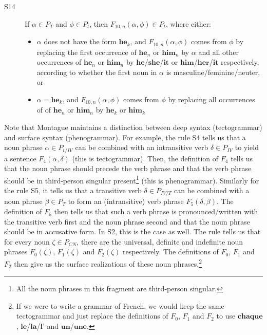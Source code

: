 \begin{description}
\item[S14] If $\alpha \in P_{T}$ and $\phi \in P_{t}$, then
  $F_{10,n}(\alpha, \phi) \in P_{t}$, where either:

  \begin{itemize}
  \item $\alpha$ does not have the form $\textbf{he}_k$, and
    $F_{10,n}(\alpha, \phi)$ comes from $\phi$ by replacing the first
    occurrence of $\textbf{he}_n$ or $\textbf{him}_n$ by $\alpha$ and all
    other occurrences of $\textbf{he}_n$ or $\textbf{him}_n$ by
    $\textbf{he}$/$\textbf{she}$/$\textbf{it}$ or
    $\textbf{him}$/$\textbf{her}$/$\textbf{it}$ respectively, according to
    whether the first noun in $\alpha$ is masculine/feminine/neuter, or
  \item $\alpha = \textbf{he}_k$, and $F_{10,n}(\alpha, \phi)$ comes from
    $\phi$ by replacing all occurrences of of $\textbf{he}_n$ or
    $\textbf{him}_n$ by $\textbf{he}_k$ or $\textbf{him}_k$
  \end{itemize}
\end{description}

Note that Montague maintains a distinction between deep syntax
(tectogrammar) and surface syntax (phenogrammar). For example, the rule S4
tells us that a noun phrase $\alpha \in P_{t / IV}$ can be combined with an
intransitive verb $\delta \in P_{IV}$ to yield a sentence
$F_4(\alpha, \delta)$ (this is tectogrammar). Then, the definition of $F_4$
tells us that the noun phrase should precede the verb phrase and that the
verb phrase should be in third-person singular present\footnote{All the
  noun phrases in this fragment are third-person singular.} (this is
phenogrammar). Similarly for the rule S5, it tells us that a transitive
verb $\delta \in P_{IV / T}$ can be combined with a noun phrase
$\beta \in P_{T}$ to form an (intransitive) verb phrase
$F_5(\delta, \beta)$. The definition of $F_5$ then tells us that such a
verb phrase is pronounced/written with the transitive verb first and the
noun phrase second and that the noun phrase should be in accusative
form. In S2, this is the case as well. The rule tells us that for every
noun $\zeta \in P_{CN}$, there are the universal, definite and indefinite
noun phrases $F_0(\zeta)$, $F_1(\zeta)$ and $F_2(\zeta)$ respectively. The
definitions of $F_0$, $F_1$ and $F_2$ then give us the surface realizations
of these noun phrases.\footnote{If we were to write a grammar of French, we
  would keep the same tectogrammar and just replace the definitions of
  $F_0$, $F_1$ and $F_2$ to use $\textbf{chaque}$,
  $\textbf{le}$/$\textbf{la}$/$\textbf{l'}$ and
  $\textbf{un}$/$\textbf{une}$.}

